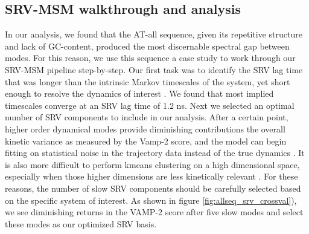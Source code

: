 \documentclass[journal=jpcbfk,manuscript=article]{achemso}
\begin{document}
\subsection{SRV-MSM walkthrough and analysis}
In our analysis, we found that the AT-all sequence, given its repetitive structure and lack of GC-content, produced the most discernable spectral gap between modes. For this reason, we use this sequence a case study to work through our SRV-MSM pipeline step-by-step. Our first task was to identify the SRV lag time that was longer than the intrinsic Markov timescales of the system, yet short enough to resolve the dynamics of interest \citep{Phys2018MarkovValidation}. We found that most implied timescales converge at an SRV lag time of 1.2 ns. Next we selected an optimal number of SRV components to include in our analysis. After a certain point, higher order dynamical modes provide diminishing contributions the overall kinetic variance as measured by the Vamp-2 score, and the model can begin fitting on statistical noise in the trajectory data instead of the true dynamics \citep{McGibbon2015VariationalKinetics}. It is also more difficult to perform kmeans clustering on a high dimensional space, especially when those higher dimensions are less kinetically relevant \citep{Pande2010EverythingAsk}. For these reasons, the number of slow SRV components should be carefully selected based on the specific system of interest. As shown in figure \ref{fig:allseq_srv_crossval}), we see diminishing returns in the VAMP-2 score after five slow modes and select these modes as our optimized SRV basis.
\end{document}
